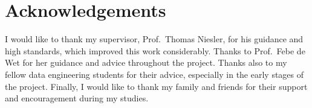 \chapter*{Acknowledgements}
\makeatletter{}\makeatother

I would like to thank my supervisor, Prof.\ Thomas Niesler, for his guidance and high standards, which improved this work considerably. Thanks to Prof.\ Febe de Wet for her guidance and advice throughout the project. Thanks also to my fellow data engineering students for their advice, especially in the early stages of the project. Finally, I would like to thank my family and friends for their support and encouragement during my studies.